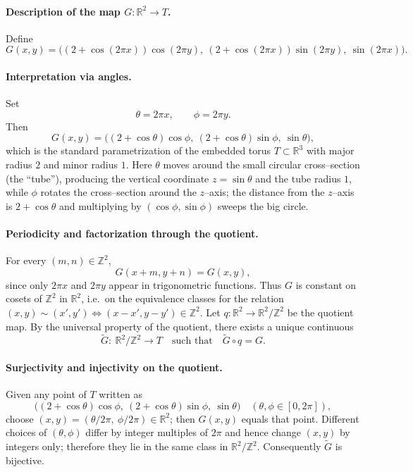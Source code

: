 \documentclass[12pt,a4paper]{article}
\theoremstyle{plain}
\theoremstyle{definition}
\theoremstyle{remark}
\theoremstyle{remark}
\begin{document}
	\paragraph{Description of the map $G:\mathbb{R}^2\to T$.}
	Define
	\[
	G(x,y)=\Big((2+\cos(2\pi x))\cos(2\pi y),\ (2+\cos(2\pi x))\sin(2\pi y),\ \sin(2\pi x)\Big).
	\]
	
	\paragraph{Interpretation via angles.}
	Set
	\[
	\theta=2\pi x,\qquad \phi=2\pi y.
	\]
	Then
	\[
	G(x,y)=\bigl((2+\cos\theta)\cos\phi,\ (2+\cos\theta)\sin\phi,\ \sin\theta\bigr),
	\]
	which is the standard parametrization of the embedded torus $T\subset\mathbb{R}^3$
	with major radius $2$ and minor radius $1$.
	Here $\theta$ moves around the small circular cross--section (the ``tube''),
	producing the vertical coordinate $z=\sin\theta$ and the tube radius $1$,
	while $\phi$ rotates the cross--section around the $z$--axis; the distance from the
	$z$--axis is $2+\cos\theta$ and multiplying by $(\cos\phi,\sin\phi)$ sweeps the big circle.
	
	\paragraph{Periodicity and factorization through the quotient.}
	For every $(m,n)\in\mathbb{Z}^2$,
	\[
	G(x+m,y+n)=G(x,y),
	\]
	since only $2\pi x$ and $2\pi y$ appear in trigonometric functions.
	Thus $G$ is constant on cosets of $\mathbb{Z}^2$ in $\mathbb{R}^2$, i.e.\ on the equivalence
	classes for the relation $(x,y)\sim(x',y')\iff (x-x',y-y')\in\mathbb{Z}^2$.
	Let $q:\mathbb{R}^2\to\mathbb{R}^2/\mathbb{Z}^2$ be the quotient map.
	By the universal property of the quotient, there exists a unique continuous
	\[
	\tilde G:\ \mathbb{R}^2/\mathbb{Z}^2 \longrightarrow T \quad\text{such that}\quad \tilde G\circ q = G.
	\]
	
	\paragraph{Surjectivity and injectivity on the quotient.}
	Given any point of $T$ written as
	\[
	\bigl((2+\cos\theta)\cos\phi,\ (2+\cos\theta)\sin\phi,\ \sin\theta\bigr)
	\quad (\theta,\phi\in[0,2\pi]),
	\]
	choose $(x,y)=(\theta/2\pi,\ \phi/2\pi)\in\mathbb{R}^2$; then $G(x,y)$ equals that point.
	Different choices of $(\theta,\phi)$ differ by integer multiples of $2\pi$ and hence change
	$(x,y)$ by integers only; therefore they lie in the same class in $\mathbb{R}^2/\mathbb{Z}^2$.
	Consequently $\tilde G$ is bijective.
	
\end{document}
